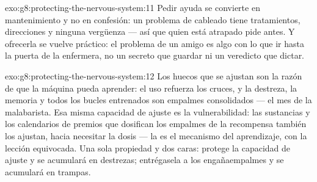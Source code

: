 \begin{solution}{exo:g8:protecting-the-nervous-system:11}
Pedir ayuda se convierte en mantenimiento y no en confesión: un
problema de cableado tiene tratamientos, direcciones y ninguna
vergüenza --- así que quien está atrapado pide antes. Y ofrecerla se
vuelve práctico: el problema de un amigo es algo con lo que ir hasta la
puerta de la enfermera, no un secreto que guardar ni un veredicto que
dictar.
\end{solution}

\begin{solution}{exo:g8:protecting-the-nervous-system:12}
Los huecos que se ajustan son la razón de que la máquina pueda
aprender: el uso refuerza los cruces, y la destreza, la memoria y todos
los bucles entrenados son empalmes consolidados --- el mes de la
malabarista. Esa misma capacidad de ajuste es la vulnerabilidad: las
sustancias y los calendarios de premios que dosifican los empalmes de
la recompensa también los ajustan, hacia necesitar la dosis --- la
 es el mecanismo del aprendizaje, con la lección equivocada.
Una sola propiedad y dos caras: protege la capacidad de ajuste y se
acumulará en destrezas; entrégasela a los engañaempalmes y se acumulará
en trampas.
\end{solution}

